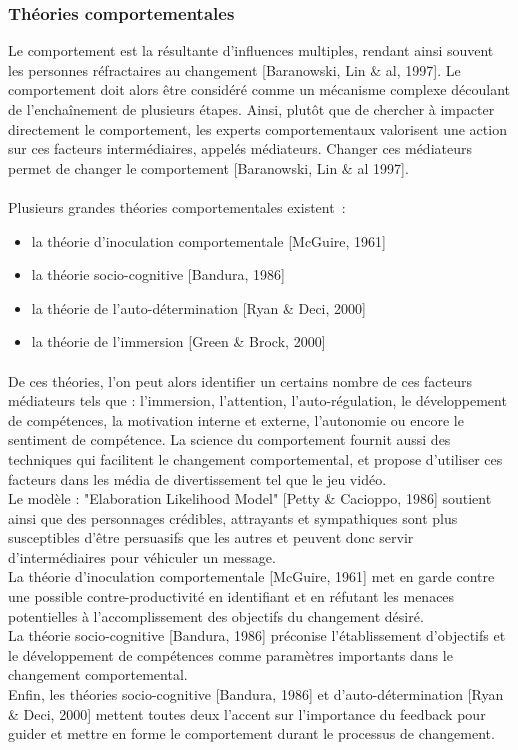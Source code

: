 		\subsubsection*{Théories comportementales}
Le comportement est la résultante d’influences multiples, rendant ainsi souvent les personnes réfractaires au changement [Baranowski, Lin \& al, 1997]\cite{Bara97}. Le comportement doit alors être considéré comme un mécanisme complexe découlant de l’enchaînement de plusieurs étapes. Ainsi, plutôt que de chercher à impacter directement le comportement, les experts comportementaux valorisent une action sur ces facteurs intermédiaires, appelés médiateurs. Changer ces médiateurs permet de changer le comportement [Baranowski, Lin \& al 1997]\cite{Bara97}.
\paragraph{}Plusieurs grandes théories comportementales existent~:
\begin{itemize}
	\item la théorie d’inoculation comportementale [McGuire, 1961]
	\item la théorie socio-cognitive [Bandura, 1986]
	\item la théorie de l’auto-détermination [Ryan \& Deci, 2000]
	\item la théorie de l’immersion [Green \& Brock, 2000]
\end{itemize}

\paragraph{}De ces théories, l’on peut alors identifier un certains nombre de ces facteurs médiateurs tels que : l’immersion, l’attention, l’auto-régulation, le développement de compétences, la motivation interne et externe, l’autonomie ou encore le sentiment de compétence. La science du comportement fournit aussi des techniques qui facilitent le changement comportemental, et propose d’utiliser ces facteurs dans les média de divertissement tel que le jeu vidéo.\\
Le modèle : "Elaboration Likelihood Model" [Petty \& Cacioppo, 1986] soutient ainsi que des personnages crédibles, attrayants et sympathiques sont plus susceptibles d’être persuasifs que les autres et peuvent donc servir d’intermédiaires pour véhiculer un message. \\
La théorie d’inoculation comportementale [McGuire, 1961] met en garde contre une possible contre-productivité en identifiant et en réfutant les menaces potentielles à l’accomplissement des objectifs du changement désiré.\\
La théorie socio-cognitive [Bandura, 1986] préconise l’établissement d’objectifs et le développement de compétences comme paramètres importants dans le changement comportemental.\\
Enfin, les théories socio-cognitive [Bandura, 1986] et d’auto-détermination [Ryan \& Deci, 2000] mettent toutes deux l’accent sur l’importance du feedback pour guider et mettre en forme le comportement durant le processus de changement.	

